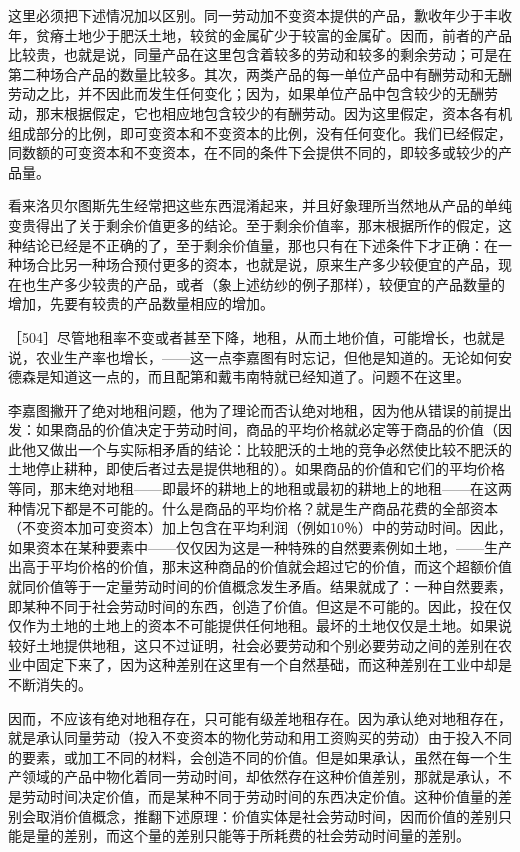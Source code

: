 这里必须把下述情况加以区别。同一劳动加不变资本提供的产品，歉收年少于丰收年，贫瘠土地少于肥沃土地，较贫的金属矿少于较富的金属矿。因而，前者的产品比较贵，也就是说，同量产品在这里包含着较多的劳动和较多的剩余劳动；可是在第二种场合产品的数量比较多。其次，两类产品的每一单位产品中有酬劳动和无酬劳动之比，并不因此而发生任何变化；因为，如果单位产品中包含较少的无酬劳动，那末根据假定，它也相应地包含较少的有酬劳动。因为这里假定，资本各有机组成部分的比例，即可变资本和不变资本的比例，没有任何变化。我们已经假定，同数额的可变资本和不变资本，在不同的条件下会提供不同的，即较多或较少的产品量。

看来洛贝尔图斯先生经常把这些东西混淆起来，并且好象理所当然地从产品的单纯变贵得出了关于剩余价值更多的结论。至于剩余价值率，那末根据所作的假定，这种结论已经是不正确的了，至于剩余价值量，那也只有在下述条件下才正确：在一种场合比另一种场合预付更多的资本，也就是说，原来生产多少较便宜的产品，现在也生产多少较贵的产品，或者（象上述纺纱的例子那样），较便宜的产品数量的增加，先要有较贵的产品数量相应的增加。


［504］尽管地租率不变或者甚至下降，地租，从而土地价值，可能增长，也就是说，农业生产率也增长，——这一点李嘉图有时忘记，但他是知道的。无论如何安德森是知道这一点的，而且配第和戴韦南特就已经知道了。问题不在这里。

李嘉图撇开了绝对地租问题，他为了理论而否认绝对地租，因为他从错误的前提出发：如果商品的价值决定于劳动时间，商品的平均价格就必定等于商品的价值（因此他又做出一个与实际相矛盾的结论：比较肥沃的土地的竞争必然使比较不肥沃的土地停止耕种，即使后者过去是提供地租的）。如果商品的价值和它们的平均价格等同，那末绝对地租——即最坏的耕地上的地租或最初的耕地上的地租——在这两种情况下都是不可能的。什么是商品的平均价格？就是生产商品花费的全部资本（不变资本加可变资本）加上包含在平均利润（例如10％）中的劳动时间。因此，如果资本在某种要素中——仅仅因为这是一种特殊的自然要素例如土地，——生产出高于平均价格的价值，那末这种商品的价值就会超过它的价值，而这个超额价值就同价值等于一定量劳动时间的价值概念发生矛盾。结果就成了：一种自然要素，即某种不同于社会劳动时间的东西，创造了价值。但这是不可能的。因此，投在仅仅作为土地的土地上的资本不可能提供任何地租。最坏的土地仅仅是土地。如果说较好土地提供地租，这只不过证明，社会必要劳动和个别必要劳动之间的差别在农业中固定下来了，因为这种差别在这里有一个自然基础，而这种差别在工业中却是不断消失的。

因而，不应该有绝对地租存在，只可能有级差地租存在。因为承认绝对地租存在，就是承认同量劳动（投入不变资本的物化劳动和用工资购买的劳动）由于投入不同的要素，或加工不同的材料，会创造不同的价值。但是如果承认，虽然在每一个生产领域的产品中物化着同一劳动时间，却依然存在这种价值差别，那就是承认，不是劳动时间决定价值，而是某种不同于劳动时间的东西决定价值。这种价值量的差别会取消价值概念，推翻下述原理：价值实体是社会劳动时间，因而价值的差别只能是量的差别，而这个量的差别只能等于所耗费的社会劳动时间量的差别。

